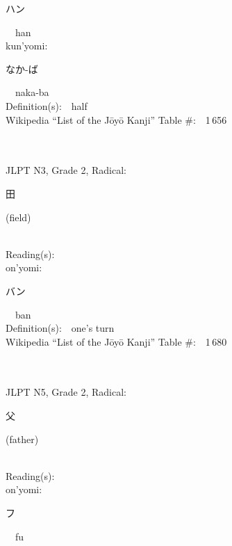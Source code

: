 \begin{multicols}{2}
{\hspace*{2em}}{\begin{CJK}{UTF8}{min} ハン \end{CJK}}\ \ han\ \ \\
{\hspace*{1em}}kun'yomi:\ \ \\
{\hspace*{2em}}{\begin{CJK}{UTF8}{min} なか-ば \end{CJK}}\ \ naka-ba\ \ \\
Definition(s):\ \ half \\
Wikipedia ``List of the J\=oy\=o Kanji'' Table \#:\ \ 1\,656 \\
\ \ \\
{\fontsize{34pt}{40pt}  }\ \ \\  %
{JLPT N3, Grade 2, Radical:\ \ {\begin{CJK}{UTF8}{min} 田 \end{CJK}} (field) } \\
Reading(s):\ \ \\
{\hspace*{1em}}on'yomi:\ \ \\
{\hspace*{2em}}{\begin{CJK}{UTF8}{min} バン \end{CJK}}\ \ ban\ \ \\
Definition(s):\ \ one's turn \\
Wikipedia ``List of the J\=oy\=o Kanji'' Table \#:\ \ 1\,680 \\
\ \ \\
{\fontsize{34pt}{40pt}  }\ \ \\  %
{JLPT N5, Grade 2, Radical:\ \ {\begin{CJK}{UTF8}{min} 父 \end{CJK}} (father) } \\
Reading(s):\ \ \\
{\hspace*{1em}}on'yomi:\ \ \\
{\hspace*{2em}}{\begin{CJK}{UTF8}{min} フ \end{CJK}}\ \ fu\ \ \\

\end{multicols}
